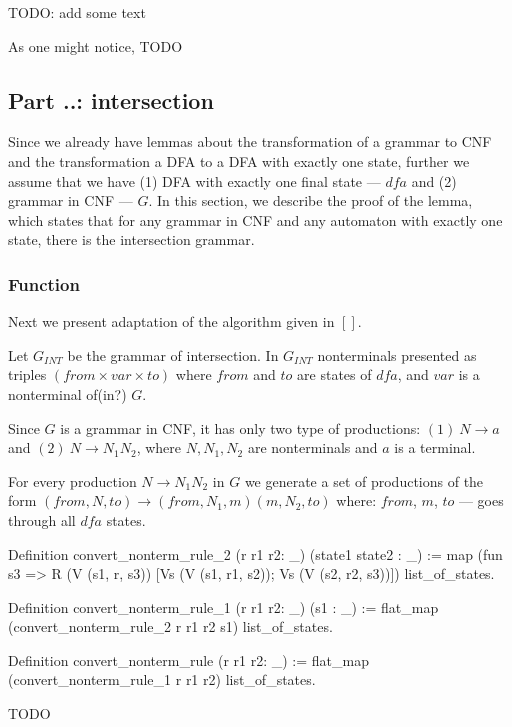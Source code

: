 TODO: add some text

As one might notice, TODO




\subsection{Part ..: intersection}

Since we already have lemmas about the transformation of a grammar to CNF and the transformation a DFA to a DFA with exactly one state, further we assume that we have (1) DFA with exactly one final state --- $dfa$ and (2) grammar in CNF --- $G$. In this section, we describe the proof of the lemma, which states that for any grammar in CNF and any automaton with exactly one state, there is the intersection grammar.

\subsubsection{Function }

Next we present adaptation of the algorithm given in $[ ]$. 

Let $G_{INT}$ be the grammar of intersection. In $G_{INT}$ nonterminals presented as triples $(from \times var \times to) $ where $from$ and $to$ are states of $dfa$, and $var$ is a nonterminal of(in?) $G$.

Since $G$ is a grammar in CNF, it has only two type of productions: $(1)\ N \to a $ and $(2) \ N \to N_{1} N_{2}$, where $N, N_1, N_2$ are nonterminals and $a$ is a terminal.

For every production $N \to N_1 N_2$ in $G$ we generate a set of productions of the form $(from, N, to) \to (from, N_1,  m) (m, N_2, to)$ where: $from$, $m$, $to$ --- goes through all $dfa$ states.

\begin{listing}[h]
    \begin{pyglist}[language=coq, numbers=none, numbersep=5pt]
  Definition convert_nonterm_rule_2 
    (r r1 r2: _) 
    (state1 state2 : _) :=
    map (fun s3 => R (V (s1, r, s3)) 
                     [Vs (V (s1, r1, s2)); 
                      Vs (V (s2, r2, s3))])
      list_of_states.

  Definition convert_nonterm_rule_1  
               (r r1 r2: _) 
               (s1 : _) :=
    flat_map (convert_nonterm_rule_2 r r1 r2 s1) 
             list_of_states.

  Definition convert_nonterm_rule (r r1 r2: _) :=
    flat_map (convert_nonterm_rule_1 r r1 r2) 
             list_of_states.
    \end{pyglist}
    \caption{TODO}
    \label{lst:verbments1}
\end{listing}

